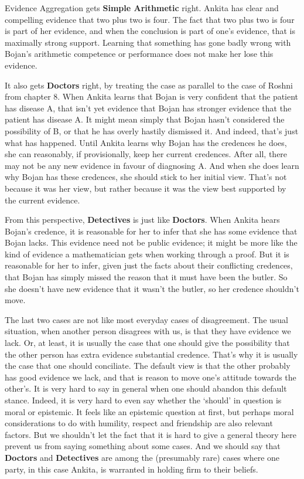 Evidence Aggregation gets \textbf{Simple Arithmetic} right. \gls{Ankita} has clear and compelling evidence that two plus two is four. The fact that two plus two is four is part of her evidence, and when the conclusion is part of one's evidence, that is maximally strong support. Learning that something has gone badly wrong with \gls{Bojan}'s arithmetic competence or performance does not make her lose this evidence.

It also gets \textbf{Doctors} right, by treating the case as parallel to the case of \gls{Roshni} from chapter 8. When \gls{Ankita} learns that \gls{Bojan} is very confident that the patient has disease A, that isn't yet evidence that \gls{Bojan} has stronger evidence that the patient has disease A. It might mean simply that \gls{Bojan} hasn't considered the possibility of B, or that he has overly hastily dismissed it. And indeed, that's just what has happened. Until \gls{Ankita} learns why \gls{Bojan} has the credences he does, she can reasonably, if provisionally, keep her current credences. After all, there may not be any new evidence in favour of diagnosing A. And when she does learn why \gls{Bojan} has these credences, she should stick to her initial view. That's not because it was her view, but rather because it was the view best supported by the current evidence.

From this perspective, \textbf{Detectives} is just like \textbf{Doctors}. When \gls{Ankita} hears \gls{Bojan}'s credence, it is reasonable for her to infer that she has some evidence that \gls{Bojan} lacks. This evidence need not be public evidence; it might be more like the kind of evidence a mathematician gets when working through a proof. But it is reasonable for her to infer, given just the facts about their conflicting credences, that \gls{Bojan} has simply missed the reason that it must have been the butler. So she doesn't have new evidence that it wasn't the butler, so her credence shouldn't move.

The last two cases are not like most everyday cases of disagreement. The usual situation, when another person disagrees with us, is that they have evidence we lack. Or, at least, it is usually the case that one should give the possibility that the other person has extra evidence substantial credence. That's why it is usually the case that one should conciliate. The default view is that the other probably has good evidence we lack, and that is reason to move one's attitude towards the other's. It is very hard to say in general when one should abandon this default stance. Indeed, it is very hard to even say whether the `should' in question is moral or epistemic. It feels like an epistemic question at first, but perhaps moral considerations to do with humility, respect and friendship are also relevant factors. But we shouldn't let the fact that it is hard to give a general theory here prevent us from saying something about some cases. And we should say that \textbf{Doctors} and \textbf{Detectives} are among the (presumably rare) cases where one party, in this case \gls{Ankita}, is warranted in holding firm to their beliefs.

